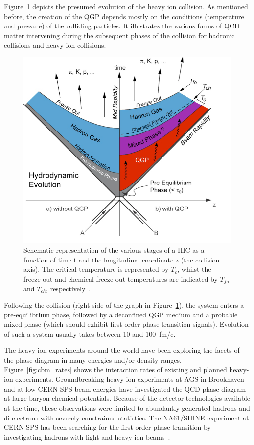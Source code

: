 Figure~\ref{fig_heavyion} depicts the presumed evolution of the heavy ion collision. As mentioned before, the creation of the \gls{QGP} depends mostly on the conditions (temperature and pressure) of the colliding particles. It illustrates the various forms of QCD matter intervening during the subsequent phases of the collision for hadronic collisions and heavy ion collisions.
\begin{figure}[!h]
\centering
 \includegraphics[width=0.6\columnwidth]{Chapter1/images/heavyion.png}
\caption{Schematic representation of the various stages of a HIC as a function of time t and the longitudinal coordinate z (the collision axis). The critical temperature is represented by $T_c$, whilst the freeze-out and chemical freeze-out temperatures are indicated by $T_{fo}$ and $T_{ch}$, respectively~\cite{Sahoo:2745520}.}
\label{fig_heavyion}
\end{figure}

 Following the collision (right side of the graph in Figure~\ref{fig_heavyion}), the system enters a pre-equilibrium phase, followed by a deconfined QGP medium and a probable mixed phase (which should exhibit first order phase transition signals). Evolution of such a system usually takes between 10 and 100~fm/c. 

The heavy ion experiments around the world have been exploring the facets of the phase diagram in many energies and/or density ranges. Figure~\ref{fig:cbm_rates} shows the interaction rates of existing and planned heavy-ion experiments. Groundbreaking heavy-ion experiments at AGS in Brookhaven and at low CERN-SPS beam energies have investigated the QCD phase diagram at large baryon chemical potentials. Because of the detector technologies available at the time, these observations were limited to abundantly generated hadrons and di-electrons with severely constrained statistics. The NA61/SHINE experiment at CERN-SPS has been searching for the first-order phase transition by investigating hadrons with light and heavy ion beams~\cite{CBM_physics, Turko:2301677}.

